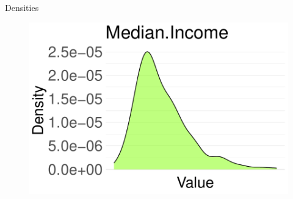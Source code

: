 \documentclass{beamer}
\begin{document}
\begin{frame}{Densities}
\begin{figure}
\begin{minipage}{0.3\textwidth}
        \includegraphics[width=\textwidth]{plots/Median.Income_density_plot.pdf}
    \end{minipage}
    
    \vspace{0.2cm} %


\end{figure}
\end{frame}
\end{document}
